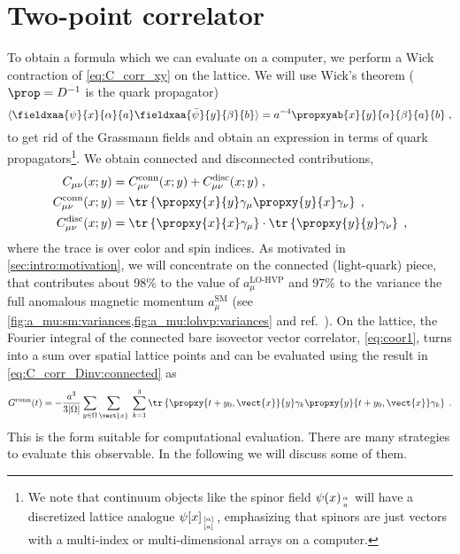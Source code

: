 \section{Two-point correlator}
\label{sec:2pt-corr}

To obtain a formula which we can evaluate on a computer, we perform a Wick contraction of \cref{eq:C_corr_xy} on the lattice.
We will use Wick's theorem ($\prop = D^{-1}$ is the quark propagator)
\begin{equation}
\langle \fieldxaa{\psi}{x}{\alpha}{a} \fieldxaa{\bar{\psi}}{y}{\beta}{b} \rangle =
a^{-4} \propxyab{x}{y}{\alpha}{\beta}{a}{b} \;,
\end{equation}
to get rid of the Grassmann fields and obtain an expression in terms of quark propagators\footnote{We note that continuum objects like the spinor field $\psi(x)_{\alpha \atop a}$ will have a discretized lattice analogue $\psi[x]_{[\alpha] \atop [a]}$, emphasizing that spinors are just vectors with a multi-index or multi-dimensional arrays on a computer.}.
We obtain connected and disconnected contributions,
\begin{align}
C_{\mu \nu}(x;y) &= C_{\mu \nu}^{\text{conn}}(x;y) + C_{\mu \nu}^{\text{disc}}(x;y) \;, \\
C_{\mu \nu}^{\text{conn}}(x;y) &=
\tr \left\{
  \propxy{x}{y} \gamma_{\mu} \propxy{y}{x} \gamma_{\nu}
\right\} \;, \label{eq:C_corr_Dinv:connected} \\
C_{\mu \nu}^{\text{disc}}(x;y) &=
\tr \left\{ \propxy{x}{x} \gamma_{\mu} \right\}
\cdot
\tr \left\{ \propxy{y}{y} \gamma_{\nu} \right\} \;,
\end{align}
where the trace is over color and spin indices.
As motivated in \cref{sec:intro:motivation}, we will concentrate on the connected (light-quark) piece, that contributes about 98\% to the value of $a_{\mu}^{\text{LO-HVP}}$ and 97\% to the variance the full anomalous magnetic momentum $a_{\mu}^{\text{SM}}$ (see \cref{fig:a_mu:sm:variances,fig:a_mu:lohvp:variances} and ref.~\cite{snowmass:2025}).
On the lattice, the Fourier integral of the connected bare isovector vector correlator, \cref{eq:coor1}, turns into a sum over spatial lattice points and can be evaluated using the result in \cref{eq:C_corr_Dinv:connected} as
\begin{equation} \label{eq:G:corr:connected}
G^{\text{conn}}(t) =
- \frac{a^{3}}{3 \lvert \Omega \rvert}
\sum_{y \in \Omega}
\sum_{\vect{x}} \;
\sum_{k=1}^{3}
\tr \left\{
  \propxy{t+y_0, \vect{x}}{y} \gamma_k \propxy{y}{t+y_0, \vect{x}} \gamma_k
\right\} \;.
\end{equation}
This is the form suitable for computational evaluation.
There are many strategies to evaluate this observable.
In the following we will discuss some of them.

